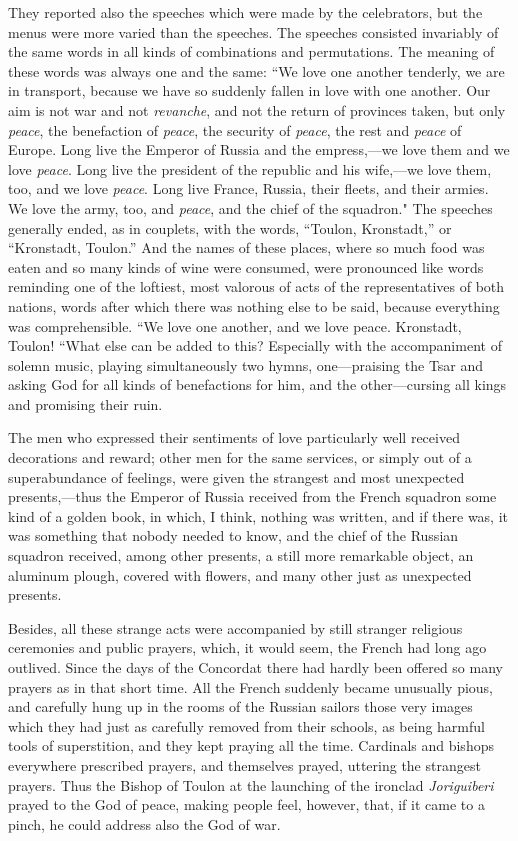 \documentclass{book}
\begin{document}
They reported also the speeches which were made by the celebrators, but the menus were more varied than the speeches. The speeches consisted invariably of the same words in all kinds of combinations and permutations. The meaning of these words was always one and the same: “We love one another tenderly, we are in transport, because we have so suddenly fallen in love with one another. Our aim is not war and not \emph{revanche}, and not the return of provinces taken, but only \emph{peace}, the benefaction of \emph{peace}, the security of \emph{peace}, the rest and \emph{peace} of Europe. Long live the Emperor of Russia and the empress,—we love them and we love \emph{peace}. Long live the president of the republic and his wife,—we love them, too, and we love \emph{peace}. Long live France, Russia, their fleets, and their armies. We love the army, too, and \emph{peace}, and the chief of the squadron." The speeches generally ended, as in couplets, with the words, “Toulon, Kronstadt,” or “Kronstadt, Toulon.” And the names of these places, where so much food was eaten and so many kinds of wine were consumed, were pronounced like words reminding one of the loftiest, most valorous of acts of the representatives of both nations, words after which there was nothing else to be said, because everything was comprehensible. “We love one another, and we love peace. Kronstadt, Toulon! “What else can be added to this? Especially with the accompaniment of solemn music, playing simultaneously two hymns, one—praising the Tsar and asking God for all kinds of benefactions for him, and the other—cursing all kings and promising their ruin.

The men who expressed their sentiments of love particularly well received decorations and reward; other men for the same services, or simply out of a superabundance of feelings, were given the strangest and most unexpected presents,—thus the Emperor of Russia received from the French squadron some kind of a golden book, in which, I think, nothing was written, and if there was, it was something that nobody needed to know, and the chief of the Russian squadron received, among other presents, a still more remarkable object, an aluminum plough, covered with flowers, and many other just as unexpected presents.

Besides, all these strange acts were accompanied by still stranger religious ceremonies and public prayers, which, it would seem, the French had long ago outlived. Since the days of the Concordat there had hardly been offered so many prayers as in that short time. All the French suddenly became unusually pious, and carefully hung up in the rooms of the Russian sailors those very images which they had just as carefully removed from their schools, as being harmful tools of superstition, and they kept praying all the time. Cardinals and bishops everywhere prescribed prayers, and themselves prayed, uttering the strangest prayers. Thus the Bishop of Toulon at the launching of the ironclad \emph{Joriguiberi} prayed to the God of peace, making people feel, however, that, if it came to a pinch, he could address also the God of war.
\end{document}
